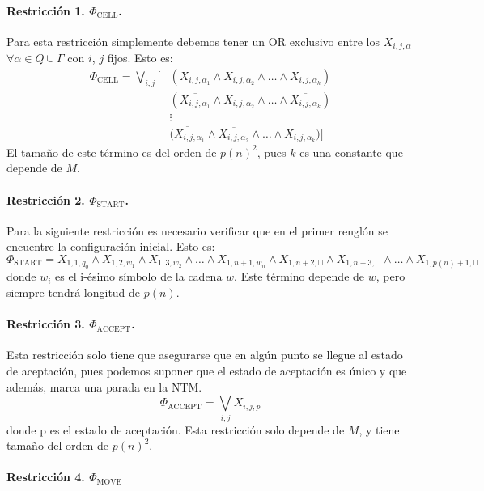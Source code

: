 \documentclass[a4paper]{article}
\begin{document}
\paragraph{Restricción 1. $\Phi_{\text{CELL}}$.}

Para esta restricción simplemente debemos tener un OR exclusivo entre los $X_{i,j,\alpha}$ $\forall \alpha \in Q \cup \Gamma$ con $i$, $j$ fijos. Esto es:
\begin{align*}
  \Phi_{\text{CELL}} = \bigvee_{i,j} \Big[ &(X_{i,j,\alpha_1} \land \overline{X_{i,j,\alpha_2}} \land \dots \land \overline{X_{i,j,\alpha_k}}) \\
  &(\overline{X_{i,j,\alpha_1}} \land X_{i,j,\alpha_2} \land \dots \land \overline{X_{i,j,\alpha_k}})\\
  &\vdots\\
  &\overline{(X_{i,j,\alpha_1}} \land \overline{X_{i,j,\alpha_2}} \land \dots \land X_{i,j,\alpha_k}) \Big]
\end{align*}
El tamaño de este término es del orden de $p(n)^2$, pues $k$ es una constante que depende de $M$.

\paragraph{Restricción 2. $\Phi_{\text{START}}$.}

Para la siguiente restricción es necesario verificar que en el primer renglón se encuentre la configuración inicial. Esto es:
$$\Phi_{\text{START}} = X_{1,1,q_0} \land X_{1,2,w_1} \land X_{1,3,w_2} \land \dots \land X_{1,n+1,w_n} \land X_{1,n+2,\sqcup} \land X_{1,n+3,\sqcup} \land \dots \land X_{1,p(n)+1,\sqcup}$$
donde $w_i$ es el i-ésimo símbolo de la cadena $w$. Este término depende de $w$, pero siempre tendrá longitud de $p(n)$.

\paragraph{Restricción 3. $\Phi_{\text{ACCEPT}}$.}

Esta restricción solo tiene que asegurarse que en algún punto se llegue al estado de aceptación, pues podemos suponer que el estado de aceptación es único y que además, marca una parada en la NTM.
$$\Phi_{\text{ACCEPT}} = \bigvee_{i, j} X_{i,j,p}$$
donde p es el estado de aceptación. Esta restricción solo depende de $M$, y tiene tamaño del orden de $p(n)^2$.


\paragraph{Restricción 4. $\Phi_{\text{MOVE}}$}
\end{document}
